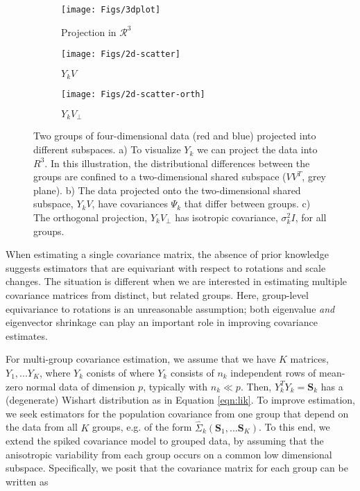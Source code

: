 \documentclass[12pt]{article}
\newcommand{\bl}[1]{{\mathbf #1}}
\begin{document}
\begin{figure}[t]
    \centering
    \begin{subfigure}[b]{0.25\textwidth}
        \texttt{[image: Figs/3dplot]}
        \caption{Projection in $\mathcal{R}^3$}
        \label{fig:dmelanRatio}
    \end{subfigure}
\quad
    \begin{subfigure}[b]{0.25\textwidth}
        \texttt{[image: Figs/2d-scatter]}
        \caption{$Y_kV$}
        \label{fig:dmelanPosterior}
    \end{subfigure}
\quad 
    \begin{subfigure}[b]{0.25\textwidth}
        \texttt{[image: Figs/2d-scatter-orth]}
        \caption{$Y_kV_{\perp}$}
        \label{fig:dmelanPosterior}
    \end{subfigure}
    \caption{ Two groups of four-dimensional data (red and blue)
      projected into different subspaces.  a) To visualize $Y_k$ we
      can project the data into $R^3$.  In this illustration, the
      distributional differences between the groups are confined to a
      two-dimensional shared subspace ($VV^T$, grey plane).  b) The
      data projected onto the two-dimensional shared subspace,
      $Y_kV$, have covariances $\Psi_k$ that differ between
      groups. c) The orthogonal projection, $Y_kV_{\perp}$
      has isotropic covariance, $\sigma_k^2I$, for all groups.  }
\label{fig:shared}
\end{figure}

When estimating a single covariance matrix, the absence of prior
knowledge suggests estimators that are equivariant with respect to
rotations and scale changes.  The situation is different when we are
interested in estimating multiple covariance matrices from distinct,
but related groups.  Here, group-level equivariance to rotations is an
unreasonable assumption; both eigenvalue \emph{and} eigenvector
shrinkage can play an important role in improving covariance
estimates.

For multi-group covariance estimation, we assume that we have $K$
matrices, $Y_1, ... Y_K$, where $Y_k$ conists of where $Y_k$ consists
of $n_k$ independent rows of mean-zero normal data of dimension $p$,
typically with $n_k \ll p$.  Then, $Y_k^TY_k = \bl S_k$ has a
(degenerate) Wishart distribution as in Equation \ref{eqn:lik}.  To
improve estimation, we seek estimators for the population covariance
from one group that depend on the data from all $K$ groups, e.g. of
the form $\hat \Sigma_k(\bl S_1, ... \bl S_K)$.  To this end, we
extend the spiked covariance model to grouped data, by assuming that
the anisotropic variability from each group occurs on a common low
dimensional subspace.  Specifically, we posit that the covariance
matrix for each group can be written as
\end{document}
